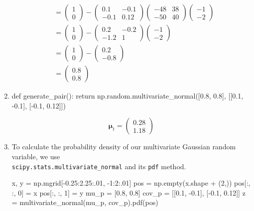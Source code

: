 \documentclass{article}
\begin{document}
\begin{enumerate}
\begin{align*}
&= \begin{pmatrix}1 \\ 0 \end{pmatrix} - 
\begin{pmatrix}
0.1 & -0.1 \\
-0.1 & 0.12
\end{pmatrix}
\begin{pmatrix}
-48 & 38 \\
-50 & 40
\end{pmatrix}
\begin{pmatrix}-1 \\ -2\end{pmatrix} \\
&= \begin{pmatrix}1 \\ 0 \end{pmatrix} - 
\begin{pmatrix}
0.2 & -0.2 \\
-1.2 & 1
\end{pmatrix}
\begin{pmatrix}-1 \\ -2\end{pmatrix} \\
&= \begin{pmatrix}1 \\ 0 \end{pmatrix} - 
\begin{pmatrix}0.2 \\ -0.8 \end{pmatrix} \\
&= \begin{pmatrix}0.8 \\ 0.8 \end{pmatrix}
\end{align*}
\item 
\begin{python}
def generate_pair():
    return np.random.multivariate_normal([0.8, 0.8], 
    					 [[0.1, -0.1],
    	 				  [-0.1, 0.12]])
\end{python}
$$
\bm{\mu}_t=\begin{pmatrix}0.28 \\ 1.18 \end{pmatrix}
$$
\item
To calculate the probability density of our multivariate Gaussian random variable, we use \\ \texttt{scipy.stats.multivariate\_normal} and its \texttt{pdf} method.
\begin{python}
x, y = np.mgrid[-0.25:2.25:.01, -1:2:.01]
pos = np.empty(x.shape + (2,))
pos[:, :, 0] = x
pos[:, :, 1] = y
mu_p = [0.8, 0.8]
cov_p = [[0.1, -0.1], [-0.1, 0.12]]
z = multivariate_normal(mu_p, cov_p).pdf(pos)


\end{python}
\end{enumerate}
\end{document}
